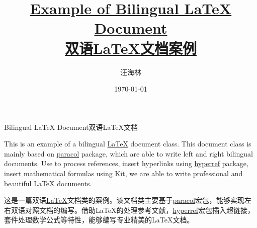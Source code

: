 \documentclass{bilidoc}
\title{\textbf{\href{https://github.com/wanghailin08/bilidoc}{Example of Bilingual \LaTeX{} Document\\双语\LaTeX{}文档案例}}}
\author{汪海林}
\date{\today}
\begin{document}
\maketitle


\tableofcontents

\newpage

\begin{Abstract}{Bilingual \LaTeX{} Document}{双语\LaTeX{}文档}

    This is an example of a bilingual \href{https://www.latex-project.org/}{\LaTeX{}} document class. This document class is mainly based on \href{https://www.ctan.org/pkg/paracol}{paracol} package, which are able to write left and right bilingual documents. Use \href{http://www.bibtex.org/}{\BibTeX{}} to process references, insert hyperlinks using \href{https://www.ctan.org/pkg/hyperref}{hyperref} package, insert mathematical formulas using \href{https://www.ctan.org/pkg/amstex}{\AMSTeX} Kit, we are able to write professional and beautiful \LaTeX{} documents.

    \switchcolumn

    这是一篇双语\href{https://www.latex-project.org/}{\LaTeX{}}文档类的案例。该文档类主要基于\href{https://www.ctan.org/pkg/paracol}{paracol}宏包，能够实现左右双语对照文档的编写。借助\LaTeX{}的\href{http://www.bibtex.org/}{\BibTeX{}}处理参考文献，\href{https://www.ctan.org/pkg/hyperref}{hyperref}宏包插入超链接，\href{https://www.ctan.org/pkg/amstex}{\AMSTeX}套件处理数学公式等特性，能够编写专业精美的\LaTeX{}文档。

\end{Abstract}




\end{document}
